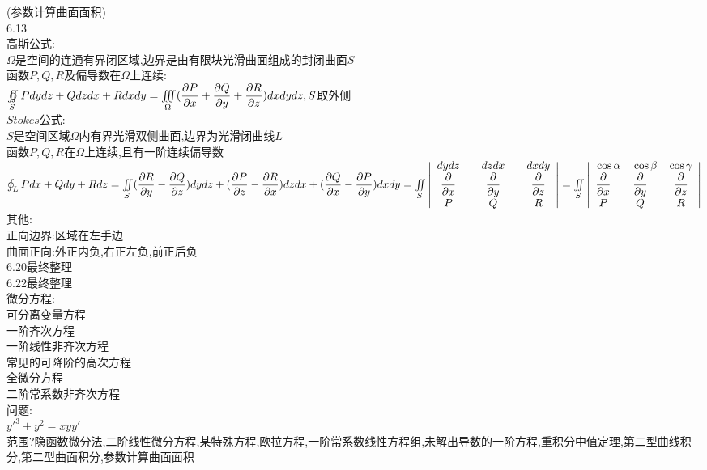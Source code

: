 \documentclass[11pt, a4paper, UTF8]{ctexart}
\begin{document}
(参数计算曲面面积)\\
6.13\\
高斯公式:\\
$ \Omega $是空间的连通有界闭区域,边界是由有限块光滑曲面组成的封闭曲面$ S $\\
函数$ P,Q,R $及偏导数在$ \Omega $上连续:\\
$ \varoiint\limits_{S}Pdydz+Qdzdx+Rdxdy=\iiint\limits_{\Omega}(\dfrac{\partial P}{\partial x}+\dfrac{\partial Q}{\partial y}+\dfrac{\partial R}{\partial z})dxdydz,S $取外侧\\
$ Stokes $公式:\\
$ S $是空间区域$ \Omega $内有界光滑双侧曲面,边界为光滑闭曲线$ L $\\
函数$ P,Q,R $在$ \Omega $上连续,且有一阶连续偏导数\\
$ \oint_L Pdx+Qdy+Rdz=\iint\limits_{S}(\dfrac{\partial R}{\partial y}-\dfrac{\partial Q}{\partial z})dydz+(\dfrac{\partial P}{\partial z}-\dfrac{\partial R}{\partial x})dzdx+(\dfrac{\partial Q}{\partial x}-\dfrac{\partial P}{\partial y})dxdy\\
=\iint\limits_{S}
\left|
\begin{array}{ccc}
dydz\quad&dzdx\quad&dxdy\\
\dfrac{\partial}{\partial x}\quad&\dfrac{\partial}{\partial y}\quad&\dfrac{\partial}{\partial z}\\
P\quad&Q\quad&R
\end{array}
\right|=
\iint\limits_{S}
\left|
\begin{array}{ccc}
\cos\alpha&\cos\beta&\cos\gamma\\
\dfrac{\partial}{\partial x}\quad&\dfrac{\partial}{\partial y}\quad&\dfrac{\partial}{\partial z}\\
P\quad&Q\quad&R
\end{array}
\right| $\\
其他:\\
正向边界:区域在左手边\\
曲面正向:外正内负,右正左负,前正后负\\
6.20最终整理\\
6.22最终整理\\
微分方程:\\
可分离变量方程\\
一阶齐次方程\\
一阶线性非齐次方程\\
常见的可降阶的高次方程\\
全微分方程\\
二阶常系数非齐次方程\\
问题:\\
$ y'^3+y^2=xyy' $\\
范围?隐函数微分法,二阶线性微分方程,某特殊方程,欧拉方程,一阶常系数线性方程组,未解出导数的一阶方程,重积分中值定理,第二型曲线积分,第二型曲面积分,参数计算曲面面积\\
\end{document}
